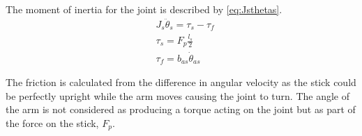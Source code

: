 The moment of inertia for the joint is described by \autoref{eq:Jsthetas}.
\begin{subequations}
\begin{flalign}
& J_s\ddot{\theta}_s=\tau_s-\tau_f  \label{eq:Jsthetas} \\
& \tau_s =F_p\frac{l_s}{2} \\
& \tau_f =b_{as}\dot{\theta}_{as} 
\end{flalign}
\end{subequations}
\startexplain
\stopexplain

The friction is calculated from the difference in angular velocity as the stick could be perfectly upright while the arm moves causing the joint to turn. The angle of the arm is not considered as producing a torque acting on the joint but as part of the force on the stick, $F_p$.

